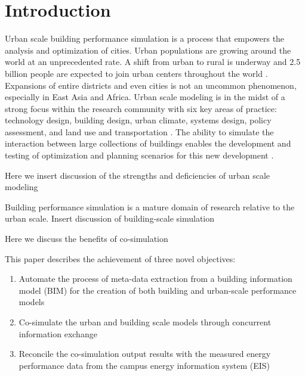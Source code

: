 \documentclass{tBPS2e}
\theoremstyle{plain}
\theoremstyle{definition}
\theoremstyle{remark}
\begin{document}
\section{Introduction}

Urban scale building performance simulation is a process that empowers the analysis and optimization of cities. Urban populations are growing around the world at an unprecedented rate. A shift from urban to rural is underway and 2.5 billion people are expected to join urban centers throughout the world \citep{UnitedNations:2014vn}. Expansions of entire districts and even cities is not an uncommon phenomenon, especially in East Asia and Africa. Urban scale modeling is in the midst of a strong focus within the research community with six key areas of practice: technology design, building design, urban climate, systems design, policy assessment, and land use and transportation \citep{Keirstead:2012ct}. The ability to simulate the interaction between large collections of buildings enables the development and testing of optimization and planning scenarios for this new development \citep{Dorer:2013vt}. 

{\color{red}Here we insert discussion of the strengths and deficiencies of urban scale modeling}

Building performance simulation is a mature domain of research relative to the urban scale. {\color{red}Insert discussion of building-scale simulation}

{\color{red}Here we discuss the benefits of co-simulation}

This paper describes the achievement of three novel objectives:
\begin{enumerate}
  \item Automate the process of meta-data extraction from a building information model (BIM) for the creation of both building and urban-scale performance models
  \item Co-simulate the urban and building scale models through concurrent information exchange
  \item Reconcile the co-simulation output results with the measured energy performance data from the campus energy information system (EIS)
\end{enumerate} 

\end{document}

